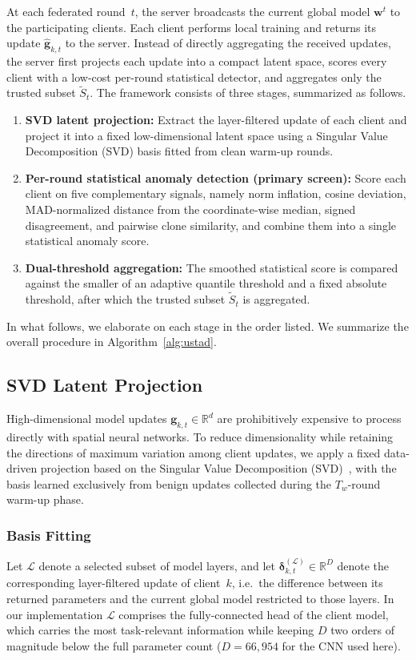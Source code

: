 \documentclass[journal]{IEEEtran}
\begin{document}
At each federated round~$t$, the server broadcasts the current global model $\mathbf{w}^t$ to the participating clients. Each client performs local training and returns its update $\hat{\mathbf{g}}_{k,t}$ to the server. Instead of directly aggregating the received updates, the server first projects each update into a compact latent space, scores every client with a low-cost per-round statistical detector, and aggregates only the trusted subset $\widetilde{S}_t$. The framework consists of three stages, summarized as follows.
\begin{enumerate}
    \item \textbf{SVD latent projection:} Extract the layer-filtered update of each client and project it into a fixed low-dimensional latent space using a Singular Value Decomposition (SVD) basis fitted from clean warm-up rounds.
    \item \textbf{Per-round statistical anomaly detection (primary screen):} Score each client on five complementary signals, namely norm inflation, cosine deviation, MAD-normalized distance from the coordinate-wise median, signed disagreement, and pairwise clone similarity, and combine them into a single statistical anomaly score.
    \item \textbf{Dual-threshold aggregation:} The smoothed statistical score is compared against the smaller of an adaptive quantile threshold and a fixed absolute threshold, after which the trusted subset $\widetilde{S}_t$ is aggregated.
\end{enumerate}

In what follows, we elaborate on each stage in the order listed. We summarize the overall procedure in Algorithm~\ref{alg:ustad}.

\subsection{SVD Latent Projection}
\label{sec:svd_projection}

High-dimensional model updates $\mathbf{g}_{k,t} \in \mathbb{R}^d$ are prohibitively expensive to process directly with spatial neural networks. To reduce dimensionality while retaining the directions of maximum variation among client updates, we apply a fixed data-driven projection based on the Singular Value Decomposition (SVD)~\cite{zhang2015singular}, with the basis learned exclusively from benign updates collected during the $T_w$-round warm-up phase.

\subsubsection{Basis Fitting}
Let $\mathcal{L}$ denote a selected subset of model layers, and let $\boldsymbol{\delta}_{k,t}^{(\mathcal{L})} \in \mathbb{R}^{D}$ denote the corresponding layer-filtered update of client~$k$, i.e.\ the difference between its returned parameters and the current global model restricted to those layers. In our implementation $\mathcal{L}$ comprises the fully-connected head of the client model, which carries the most task-relevant information while keeping $D$ two orders of magnitude below the full parameter count ($D = 66{,}954$ for the CNN used here).
\end{document}
